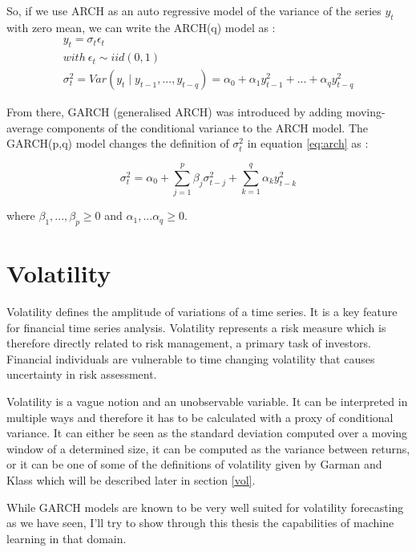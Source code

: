 \documentclass[11pt,a4paper,oneside]{book}
\begin{document}
So, if we use ARCH as an auto regressive model of the variance of the series $y_t$ with zero mean, we can write the ARCH(q) model as : 
\begin{equation}\label{eq:arch}
\begin{matrix}
y_t = \sigma_t \epsilon_t \\
with \ \epsilon_t \sim iid(0,1) \\
\sigma_t^2 = Var(y_t \mid y_{t-1},..., y_{t-q}) = \alpha_0 + \alpha_1 y_{t-1}^2 + ... + \alpha_q y_{t-q}^2
\end{matrix}
\end{equation}


From there, GARCH (generalised ARCH) was introduced by adding moving-average components of the conditional variance to the ARCH model. The GARCH(p,q) model changes the definition of $\sigma_t^2$ in equation \ref{eq:arch} as : 

\begin{equation}
\sigma_t^2 = \alpha_0 + \sum_{j=1}^p\beta_j \sigma_{t-j}^2 + \sum_{k=1}^q\alpha_k y_{t-k}^2 
\end{equation}

where $ \beta_1,..., \beta_p \geq 0$ and $\alpha_1,...\alpha_q \geq 0$. \cite{Holan}



\section{Volatility}

Volatility defines the amplitude of variations of a time series. It is a key feature for financial time series analysis. Volatility represents a risk measure which is therefore directly related to risk management, a primary task of investors. Financial individuals are vulnerable to time changing volatility that causes uncertainty in risk assessment. 

Volatility is a vague notion and an unobservable variable. It can be interpreted in multiple ways and therefore it has to be calculated with a proxy of conditional variance. It can either be seen as the standard deviation computed over a moving window of a determined size, it can be computed as the variance between returns, or it can be one of some of the definitions of volatility given by Garman and Klass \cite{garm} which will be described later in section \ref{vol}.

While GARCH models are known to be very well suited for volatility forecasting as we have seen, I'll try to show through this thesis the capabilities of machine learning in that domain.
\end{document}

